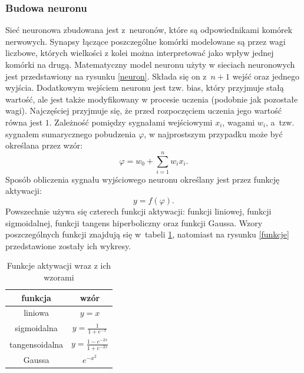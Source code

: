 \subsubsection{Budowa neuronu}
Sieć neuronowa zbudowana jest z~neuronów, które są odpowiednikami komórek nerwowych. Synapsy łączące poszczególne komórki modelowane są przez wagi liczbowe, których wielkości z kolei można interpretować jako wpływ jednej komórki na drugą. Matematyczny model neuronu użyty w sieciach neuronowych jest przedstawiony na rysunku \ref{neuron}. Składa się on z~$n+1$ wejść oraz jednego wyjścia. Dodatkowym wejściem neuronu jest tzw. bias, który przyjmuje stałą wartość, ale jest także modyfikowany w procesie uczenia (podobnie jak pozostałe wagi). Najczęściej przyjmuje się, że przed rozpoczęciem uczenia jego wartość równa jest $1$. Zależność pomiędzy sygnałami wejściowymi $x_i$, wagami $w_i$, a~tzw. sygnałem sumarycznego pobudzenia $\varphi$, w najprostszym przypadku może być określana przez wzór:
\begin{equation}
\varphi=w_0 + \sum_{i=1}^{n}w_i x_i.
\end{equation}
Sposób obliczenia sygnału wyjściowego neuronu określany jest przez funkcję aktywacji:
\begin{equation}
y=f(\varphi).
\end{equation}
Powszechnie używa się czterech funkcji aktywacji: funkcji liniowej, funkcji sigmoidalnej, funkcji tangens hiperboliczny oraz funkcji Gaussa\cite{leksykon}. Wzory poszczególnych funkcji znajdują się w~tabeli \ref{table:activation}, natomiast na rysunku \ref{funkcje} przedstawione zostały ich wykresy.

\begin{table}
\centering
\begin{tabular}{|c|c|}
\hline
funkcja & wzór \\
 \hline
liniowa  & $y=x$ \\  
 \hline
sigmoidalna  & $y=\frac{1}{1+e^{-x}}$ \\  
 \hline  
tangensoidalna  & $y = \frac{1-e^{-2x}}{1+e^{-2x}}$ \\  
\hline 
Gaussa & $e^{-x^2}$\\  
\hline 
 \end{tabular}
 \caption{Funkcje aktywacji wraz z ich wzorami} \label{table:activation}
\end{table}

